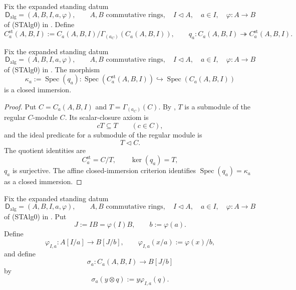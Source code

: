 \begin{definition}
  \label{def:nagata-strict-transform-chart-ring}
  \lean{}

  Fix the expanded standing datum
  \[
    \mathsf D_{\mathrm{alg}}=(A,B,I,a,\varphi),\qquad
    A,B\text{ commutative rings},\quad
    I\triangleleft A,\quad a\in I,\quad
    \varphi\colon A\to B
  \]
  of (STAlg0) in
  .
  Define
  \[
    C_a^{\mathrm{st}}(A,B,I)
      :=C_a(A,B,I)/\Gamma_{(a_C)}(C_a(A,B,I)),
    \qquad
    q_a\colon C_a(A,B,I)\twoheadrightarrow C_a^{\mathrm{st}}(A,B,I).
  \]
\end{definition}

\begin{lemma}
  \label{lemma:nagata-strict-transform-chart-closed}
  \lean{}

  Fix the expanded standing datum
  \[
    \mathsf D_{\mathrm{alg}}=(A,B,I,a,\varphi),\qquad
    A,B\text{ commutative rings},\quad
    I\triangleleft A,\quad a\in I,\quad
    \varphi\colon A\to B
  \]
  of (STAlg0) in
  .
  The morphism
  \[
    \kappa_a:=\operatorname{Spec}(q_a)\colon
      \operatorname{Spec}(C_a^{\mathrm{st}}(A,B,I))
      \hookrightarrow\operatorname{Spec}(C_a(A,B,I))
  \]
  is a closed immersion.
\end{lemma}

\begin{proof}
  Put $C=C_a(A,B,I)$ and $T=\Gamma_{(a_C)}(C)$.  By
  , $T$ is a submodule of the
  regular $C$-module $C$.  Its scalar-closure axiom is
  \[
    cT\subseteq T\qquad(c\in C),
  \]
  and the ideal predicate for a submodule of the regular module is
  \[
    T\triangleleft C.
  \]
  The quotient identities are
  \[
    C_a^{\mathrm{st}}=C/T,\qquad\ker(q_a)=T,
  \]
  $q_a$ is surjective.  The affine closed-immersion criterion identifies
  $\operatorname{Spec}(q_a)=\kappa_a$ as a closed immersion.
\end{proof}

\begin{definition}
  \label{def:nagata-strict-chart-to-extended-blowup-chart}
  \lean{}

  Fix the expanded standing datum
  \[
    \mathsf D_{\mathrm{alg}}=(A,B,I,a,\varphi),\qquad
    A,B\text{ commutative rings},\quad
    I\triangleleft A,\quad a\in I,\quad
    \varphi\colon A\to B
  \]
  of (STAlg0) in
  .
  Put
  \[
    J:=IB=\varphi(I)B,\qquad b:=\varphi(a).
  \]
  Define
  \[
    \varphi_{I,a}\colon A[I/a]\to B[J/b],
    \qquad \varphi_{I,a}(x/a):=\varphi(x)/b,
  \]
  and define
  \[
    \sigma_a\colon C_a(A,B,I)\longrightarrow B[J/b]
  \]
  by
  \[
    \sigma_a(y\otimes q):=y\varphi_{I,a}(q).
  \]
\end{definition}

